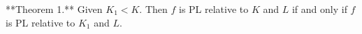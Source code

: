 **Theorem 1.** Given $K_1 < K$. Then $f$ is PL relative to $K$ and $L$ if and only if $f$ is PL relative to $K_1$ and $L$.
